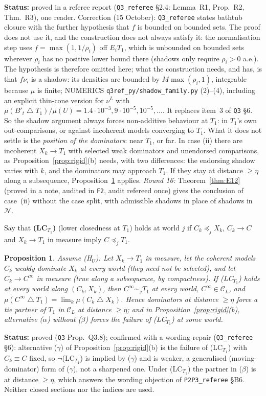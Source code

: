 \documentclass[11pt]{article}
\newtheorem{proposition}[theorem]{Proposition}
\theoremstyle{definition}
\theoremstyle{remark}
\newcommand{\C}{\mathcal C}
\newcommand{\sd}{\mathbin{\triangle}}
\newcommand{\src}[1]{\texttt{#1}}
\newcommand{\status}[1]{\par\smallskip\noindent\textbf{Status:} #1\par\smallskip}
\begin{document}
\status{proved in a referee report (\src{Q3\_referee} \S2.4: Lemma~R1, Prop.~R2, Thm.~R3), one reader. Correction (15 October): \src{Q3\_referee} states bathtub closure with the further hypothesis that $f$ is bounded on bounded sets. The proof does not use it, and the construction does not always satisfy it: the normalisation step uses $f=\max(1,1/\rho_i)$ off $E_iT_1$, which is unbounded on bounded sets wherever $\rho_i$ has no positive lower bound there (shadows only require $\rho_i>0$ a.e.). The hypothesis is therefore omitted here; what the construction needs, and has, is that $f\nu_i$ is a shadow: its densities are bounded by $M\max(\rho_i,1)$, integrable because $\mu$ is finite; NUMERICS \src{q3ref\_py/shadow\_family.py} (2)--(4), including an explicit thin-cone version for $\nu^L$ with $\mu(B'_t\sd T_1)/\mu(U)=1.4\cdot10^{-3},9\cdot10^{-5},10^{-5},\dots$. It replaces item~3 of \src{Q3} \S6. So the shadow argument always forces non-additive behaviour at $T_1$: in $T_1$'s own out-comparisons, or against incoherent models converging to $T_1$. What it does not settle is the \emph{position of the dominators}: near $T_1$, or far. In case (ii) there are incoherent $X_k\to T_1$ with selected weak dominators and unendorsed comparisons, as Proposition~\ref{prop:rigid}(b) needs, with two differences: the endorsing shadow varies with $k$, and the dominators may approach $T_1$. If they stay at distance $\ge\eta$ along a subsequence, Proposition~\ref{prop:Q38} applies. \emph{Round 16:} Theorem~\ref{thm:E12} (proved in a note, audited in \src{F2}, audit refereed once) gives the conclusion of case~(ii) without the case split, with admissible shadows in place of shadows in $\mathcal N$.}

Say that \textbf{(LC$_{T_1}$)} (lower closedness at $T_1$) holds at world $j$ if $C_k\preceq_jX_k$, $C_k\to C$ and $X_k\to T_1$ in measure imply $C\preceq_jT_1$.

\begin{proposition}\label{prop:Q38}
Assume (H$_U$). Let $X_k\to T_1$ in measure, let the coherent models $C_k$ weakly dominate $X_k$ at every world (they need not be selected), and let $C_k\to C^\infty$ in measure (true along a subsequence, by compactness). If (LC$_{T_1}$) holds at every world along $(C_k,X_k)$, then $C^\infty\sim_jT_1$ at every world, $C^\infty\in\C_L$, and $\mu(C^\infty\sd T_1)=\lim_k\mu(C_k\sd X_k)$. Hence dominators at distance $\ge\eta$ force a tie partner of $T_1$ in $\C_L$ at distance $\ge\eta$; and in Proposition~\ref{prop:rigid}(b), alternative ($\alpha$) without ($\beta$) forces the failure of (LC$_{T_1}$) at some world.
\end{proposition}
\status{proved (\src{Q3} Prop.~Q3.8); confirmed with a wording repair (\src{Q3\_referee} \S6): alternative ($\gamma$) of Proposition~\ref{prop:rigid}(b) is the failure of (LC$_{T_1}$) with $C_k\equiv C$ fixed, so $\neg$(LC$_{T_1}$) is implied by ($\gamma$) and is weaker, a generalised (moving-dominator) form of ($\gamma$), not a sharpened one. Under (LC$_{T_1}$) the partner in ($\beta$) is at distance $\ge\eta$, which answers the wording objection of \src{P2P3\_referee} \S B6. Neither closed sections nor the indices are used.}
\end{document}
